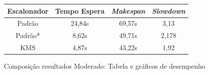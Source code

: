 \begin{figure}[!ht]
	\centering
	\begin{tabular}[b]{cccc}\hline
		Escalonador & Tempo Espera & \textit{Makespan} & \textit{Slowdown}\\ \hline
		Padrão  & 24,84s & 69,57s & 3,13\\
		Padrão* & 8,62s  & 49,71s & 2,178 \\
		KMS     & 4,87s & 43,22s & 1,92 \\ \hline
	\end{tabular}
	\qquad
	\qquad
	\qquad
	\caption{Composição resultados Moderado: Tabela e gráficos de desempenho}
	\label{fig:cenario-base}
\end{figure}

